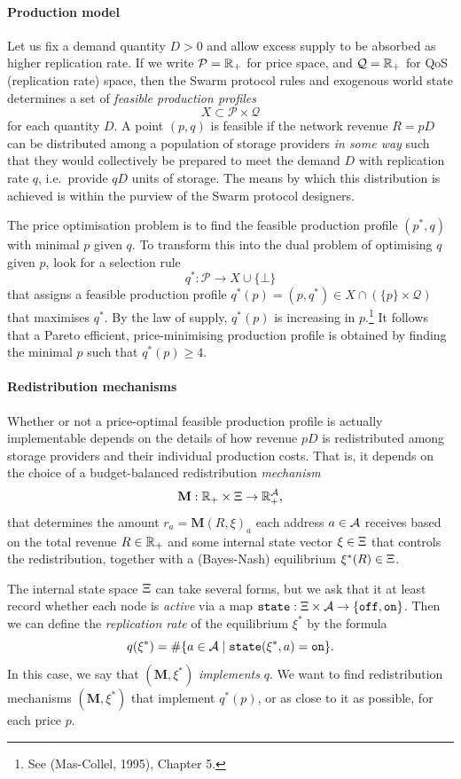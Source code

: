 \paragraph{Production model}
Let us fix a demand quantity $D>0$ and allow excess supply to be absorbed as higher replication rate.
%
If we write $\mathcal{P}=\mathbb{R}_+$ for price space, and $\mathcal{Q}=\mathbb{R}_+$ for QoS (replication rate) space, then the Swarm protocol rules and exogenous world state determines a set of \emph{feasible production profiles}
%
\[
  X \subset \mathcal{P}\times\mathcal{Q}
\]
%
for each quantity $D$.
%
A point $(p,q)$ is feasible if the network revenue $R=pD$ can be distributed among a population of storage providers \emph{in some way} such that they would collectively be prepared to meet the demand $D$ with replication rate $q$, i.e.~provide $qD$ units of storage.
%
The means by which this distribution is achieved is within the purview of the Swarm protocol designers.

The price optimisation problem is to find the feasible production profile $(p^*,q)$ with minimal $p$ given $q$.
%
To transform this into the dual problem of optimising $q$ given $p$, look for a selection rule 
\[
  q^*:\mathcal{P}\rightarrow X\cup\{\bot\}
\]
that assigns a feasible production profile $q^*(p)=(p,q^*)\in X\cap (\{p\}\times\mathcal{Q})$ that maximises $q^*$.
%
By the law of supply, $q^*(p)$ is increasing in $p$.\footnote{See (Mas-Collel, 1995), Chapter 5.}
%
It follows that a Pareto efficient, price-minimising production profile is obtained by finding the minimal $p$ such that $q^*(p)\geq 4$.

\paragraph{Redistribution mechanisms}
Whether or not a price-optimal feasible production profile is actually implementable depends on the details of how revenue $pD$ is redistributed among storage providers and their individual production costs.
%
That is, it depends on the choice of a budget-balanced redistribution \emph{mechanism}
\[
  \mathbf{M}:\mathbb{R}_+ \times \Xi \rightarrow \mathbb{R}_+^{\mathcal{A}},
\]
that determines the amount $r_a=\mathbf{M}(R,\xi)_a$ each address $a\in\mathcal{A}$ receives based on the total revenue $R\in\mathbb{R}_+$ and some internal state vector $\xi\in\Xi$ that controls the redistribution, together with a (Bayes-Nash) equilibrium $\xi^*(R)\in\Xi$.

The internal state space $\Xi$ can take several forms, but we ask that it at least record whether each node is \emph{active} via a map $\mathtt{state}:\Xi\times\mathcal{A}\rightarrow \{\mathtt{off},\mathtt{on}\}$.
%
Then we can define the \emph{replication rate} of the equilibrium $\xi^*$ by the formula
\[
  q(\xi^*) = \#\{a\in\mathcal{A} \mid \mathtt{state}(\xi^*,a)=\mathtt{on}\}.
\]
In this case, we say that $(\mathbf{M},\xi^*)$ \emph{implements} $q$.
%
We want to find redistribution mechanisms $(\mathbf{M},\xi^*)$ that implement $q^*(p)$, or as close to it as possible, for each price $p$.

